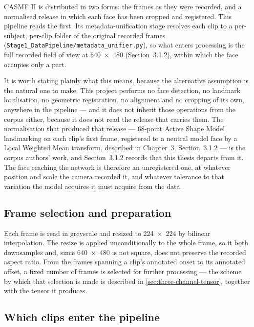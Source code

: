CASME II is distributed in two forms: the frames as they were recorded, and a normalised release in which each face has been cropped and registered. This pipeline reads the first. Its metadata-unification stage resolves each clip to a per-subject, per-clip folder of the original recorded frames (\texttt{Stage1\_DataPipeline/metadata\_unifier.py}), so what enters processing is the full recorded field of view at 640~$\times$~480 (Section~3.1.2), within which the face occupies only a part.

It is worth stating plainly what this means, because the alternative assumption is the natural one to make. This project performs no face detection, no landmark localisation, no geometric registration, no alignment and no cropping of its own, anywhere in the pipeline --- and it does not inherit those operations from the corpus either, because it does not read the release that carries them. The normalisation that produced that release --- 68-point Active Shape Model landmarking on each clip's first frame, registered to a neutral model face by a Local Weighted Mean transform, described in Chapter~3, Section~3.1.2 --- is the corpus authors' work, and Section~3.1.2 records that this thesis departs from it. The face reaching the network is therefore an unregistered one, at whatever position and scale the camera recorded it, and whatever tolerance to that variation the model acquires it must acquire from the data.

\subsection{Frame selection and preparation}
\label{sec:frame-preparation}

Each frame is read in greyscale and resized to 224~$\times$~224 by bilinear interpolation. The resize is applied unconditionally to the whole frame, so it both downsamples and, since 640~$\times$~480 is not square, does not preserve the recorded aspect ratio. From the frames spanning a clip's annotated onset to its annotated offset, a fixed number of frames is selected for further processing --- the scheme by which that selection is made is described in \autoref{sec:three-channel-tensor}, together with the tensor it produces.

\subsection{Which clips enter the pipeline}
\label{sec:clip-selection}


